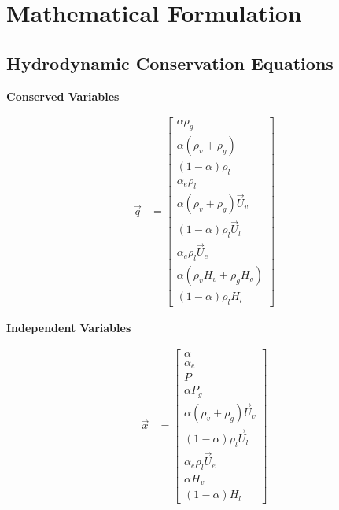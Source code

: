 
\chapter{Mathematical Formulation}

\section{Hydrodynamic Conservation Equations}

\begin{minipage}{0.42\textwidth}
 \begin{center}\textbf{Conserved Variables}\end{center}
 \begin{align}
 \Vec{q} & = 
 \begin{bmatrix} 
 \alpha \rho_g  \\
 \alpha \left( \rho_v + \rho_g \right)\\
 \left(1-\alpha\right) \rho_l \\
 \alpha_e \rho_l \\
 \alpha \left( \rho_v + \rho_g \right) \Vec{U}_v \\
 \left( 1-\alpha \right) \rho_l \Vec{U}_l \\
 \alpha_e \rho_l \Vec{U}_e \\
 \alpha \left( \rho_v H_v+ \rho_g H_g \right)\\
 \left( 1 -\alpha \right) \rho_l H_l
 \end{bmatrix} 
 \end{align}
 \end{minipage}
 \begin{minipage}{0.42\textwidth}
 \begin{center}\textbf{Independent Variables}\end{center}
 \begin{align}
 \Vec{x} & = \begin{bmatrix}
 \alpha \\
 \alpha_e \\
 P \\
 \alpha P_g \\
 \alpha \left( \rho_v + \rho_g \right) \Vec{U}_v \\
 \left( 1-\alpha \right) \rho_l \Vec{U}_l \\
 \alpha_e  \rho_l \Vec{U}_e \\
 \alpha H_v \\
 \left( 1-\alpha \right) H_l
 \end{bmatrix}
 \end{align}
 \end{minipage}

